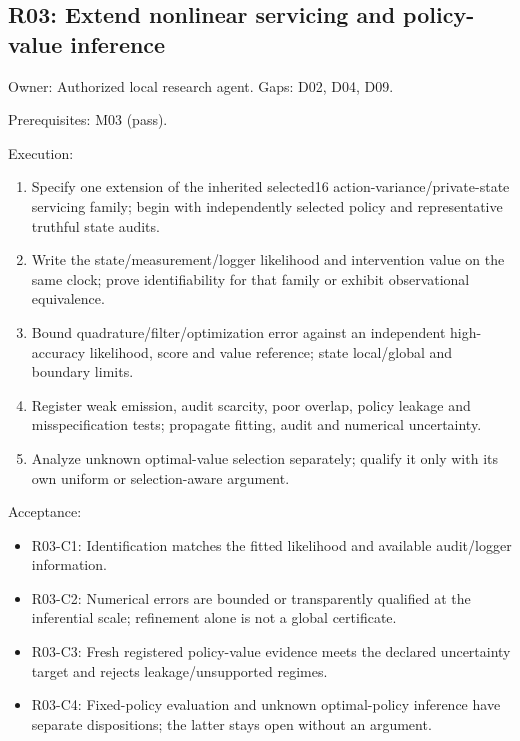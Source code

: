 \documentclass[
  11pt,
  a4paper,
]{article}
\providecommand{\tightlist}{%
  \setlength{\itemsep}{0pt}\setlength{\parskip}{0pt}}
\begin{document}
\hypertarget{r03-extend-nonlinear-servicing-and-policy-value-inference}{%
\subsection{R03: Extend nonlinear servicing and policy-value
inference}\label{r03-extend-nonlinear-servicing-and-policy-value-inference}}

Owner: Authorized local research agent. Gaps: D02, D04, D09.

Prerequisites: M03 (pass).

Execution:

\begin{enumerate}
\def\labelenumi{\arabic{enumi}.}
\tightlist
\item
  Specify one extension of the inherited selected16
  action-variance/private-state servicing family; begin with
  independently selected policy and representative truthful state
  audits.
\item
  Write the state/measurement/logger likelihood and intervention value
  on the same clock; prove identifiability for that family or exhibit
  observational equivalence.
\item
  Bound quadrature/filter/optimization error against an independent
  high-accuracy likelihood, score and value reference; state
  local/global and boundary limits.
\item
  Register weak emission, audit scarcity, poor overlap, policy leakage
  and misspecification tests; propagate fitting, audit and numerical
  uncertainty.
\item
  Analyze unknown optimal-value selection separately; qualify it only
  with its own uniform or selection-aware argument.
\end{enumerate}

Acceptance:

\begin{itemize}
\tightlist
\item
  R03-C1: Identification matches the fitted likelihood and available
  audit/logger information.
\item
  R03-C2: Numerical errors are bounded or transparently qualified at the
  inferential scale; refinement alone is not a global certificate.
\item
  R03-C3: Fresh registered policy-value evidence meets the declared
  uncertainty target and rejects leakage/unsupported regimes.
\item
  R03-C4: Fixed-policy evaluation and unknown optimal-policy inference
  have separate dispositions; the latter stays open without an argument.
\end{itemize}
\end{document}
